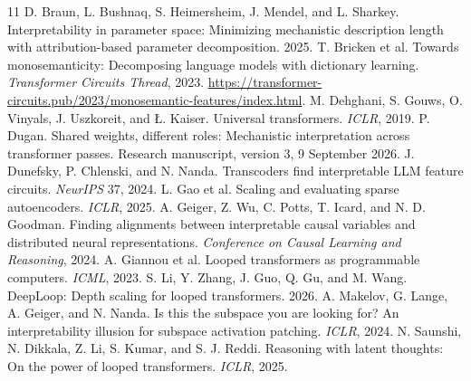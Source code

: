 \documentclass[10pt,letterpaper]{article}
\begin{document}
\begin{thebibliography}{11}
\setlength{\itemsep}{1pt}
 D. Braun, L. Bushnaq, S. Heimersheim, J. Mendel, and L. Sharkey. Interpretability in parameter space: Minimizing mechanistic description length with attribution-based parameter decomposition. 2025.
 T. Bricken et al. Towards monosemanticity: Decomposing language models with dictionary learning. \emph{Transformer Circuits Thread}, 2023. \url{https://transformer-circuits.pub/2023/monosemantic-features/index.html}.
 M. Dehghani, S. Gouws, O. Vinyals, J. Uszkoreit, and \L{}. Kaiser. Universal transformers. \emph{ICLR}, 2019.
 P. Dugan. Shared weights, different roles: Mechanistic interpretation across transformer passes. Research manuscript, version 3, 9 September 2026.
 J. Dunefsky, P. Chlenski, and N. Nanda. Transcoders find interpretable LLM feature circuits. \emph{NeurIPS} 37, 2024.
 L. Gao et al. Scaling and evaluating sparse autoencoders. \emph{ICLR}, 2025.
 A. Geiger, Z. Wu, C. Potts, T. Icard, and N. D. Goodman. Finding alignments between interpretable causal variables and distributed neural representations. \emph{Conference on Causal Learning and Reasoning}, 2024.
 A. Giannou et al. Looped transformers as programmable computers. \emph{ICML}, 2023.
 S. Li, Y. Zhang, J. Guo, Q. Gu, and M. Wang. DeepLoop: Depth scaling for looped transformers. 2026.
 A. Makelov, G. Lange, A. Geiger, and N. Nanda. Is this the subspace you are looking for? An interpretability illusion for subspace activation patching. \emph{ICLR}, 2024.
 N. Saunshi, N. Dikkala, Z. Li, S. Kumar, and S. J. Reddi. Reasoning with latent thoughts: On the power of looped transformers. \emph{ICLR}, 2025.
\end{thebibliography}
\end{document}
